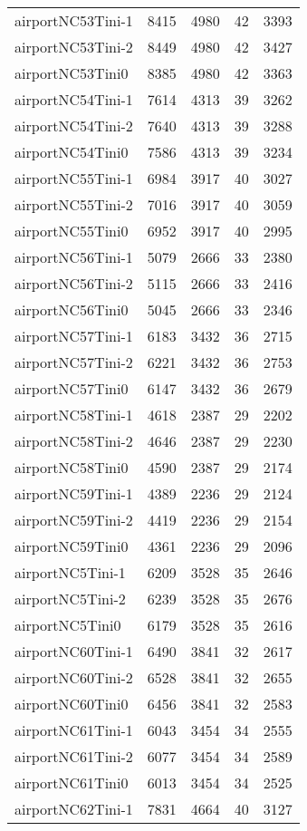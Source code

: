 \begin{longtable}{lrrrr}
airportNC53Tini-1 & 8415 & 4980 & 42 & 3393 \\
airportNC53Tini-2 & 8449 & 4980 & 42 & 3427 \\
airportNC53Tini0 & 8385 & 4980 & 42 & 3363 \\
airportNC54Tini-1 & 7614 & 4313 & 39 & 3262 \\
airportNC54Tini-2 & 7640 & 4313 & 39 & 3288 \\
airportNC54Tini0 & 7586 & 4313 & 39 & 3234 \\
airportNC55Tini-1 & 6984 & 3917 & 40 & 3027 \\
airportNC55Tini-2 & 7016 & 3917 & 40 & 3059 \\
airportNC55Tini0 & 6952 & 3917 & 40 & 2995 \\
airportNC56Tini-1 & 5079 & 2666 & 33 & 2380 \\
airportNC56Tini-2 & 5115 & 2666 & 33 & 2416 \\
airportNC56Tini0 & 5045 & 2666 & 33 & 2346 \\
airportNC57Tini-1 & 6183 & 3432 & 36 & 2715 \\
airportNC57Tini-2 & 6221 & 3432 & 36 & 2753 \\
airportNC57Tini0 & 6147 & 3432 & 36 & 2679 \\
airportNC58Tini-1 & 4618 & 2387 & 29 & 2202 \\
airportNC58Tini-2 & 4646 & 2387 & 29 & 2230 \\
airportNC58Tini0 & 4590 & 2387 & 29 & 2174 \\
airportNC59Tini-1 & 4389 & 2236 & 29 & 2124 \\
airportNC59Tini-2 & 4419 & 2236 & 29 & 2154 \\
airportNC59Tini0 & 4361 & 2236 & 29 & 2096 \\
airportNC5Tini-1 & 6209 & 3528 & 35 & 2646 \\
airportNC5Tini-2 & 6239 & 3528 & 35 & 2676 \\
airportNC5Tini0 & 6179 & 3528 & 35 & 2616 \\
airportNC60Tini-1 & 6490 & 3841 & 32 & 2617 \\
airportNC60Tini-2 & 6528 & 3841 & 32 & 2655 \\
airportNC60Tini0 & 6456 & 3841 & 32 & 2583 \\
airportNC61Tini-1 & 6043 & 3454 & 34 & 2555 \\
airportNC61Tini-2 & 6077 & 3454 & 34 & 2589 \\
airportNC61Tini0 & 6013 & 3454 & 34 & 2525 \\
airportNC62Tini-1 & 7831 & 4664 & 40 & 3127 \\

\end{longtable}
